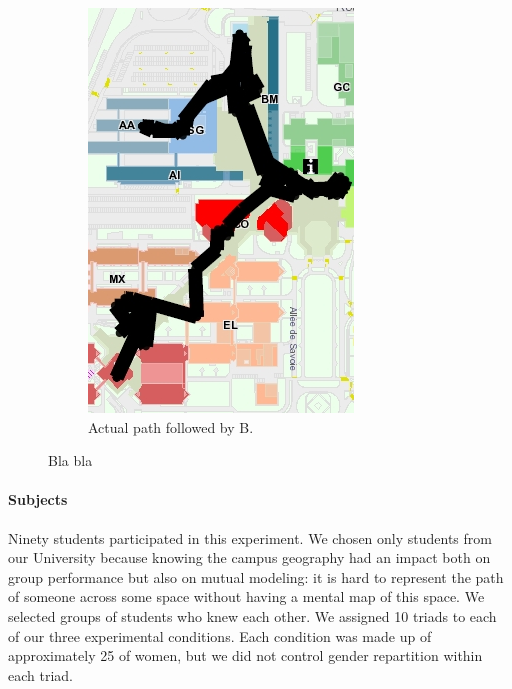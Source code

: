 \documentclass[twocolumn]{article}
\begin{document}
\begin{figure}[h!t]
\begin{subfigure}{.3\textwidth}
            \includegraphics[width=\linewidth]{image7.png}
            \caption{Actual path followed by B.}
        \end{subfigure}
        \caption{Bla bla}
        \label{study2:paths}
\end{figure}

\paragraph{Subjects}

Ninety students participated in this experiment. We chosen only students from
our University because knowing the campus geography had an impact both on group
performance but also on mutual modeling: it is hard to represent the path of
someone across some space without having a mental map of this space. We selected
groups of students who knew each other. We assigned 10 triads to each of our
three experimental conditions. Each condition was made up of approximately 25%
of women, but we did not control gender repartition within each triad.
\end{document}
